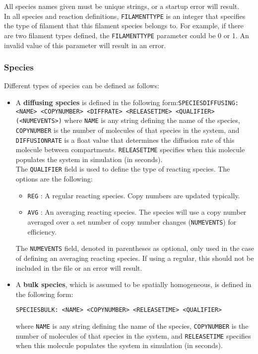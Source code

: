 \documentclass[11pt, oneside]{article}   	%
\begin{document}
\noindent All species names given must be unique strings, or a startup error will result.\\

\noindent In all species and reaction definitions, \texttt{FILAMENTTYPE} is an integer that specifies the type of filament that this filament species belongs to. For example, if there are two filament types defined, the \texttt{FILAMENTTYPE} parameter could be 0 or 1. An invalid value of this parameter will result in an error.

\subsubsection{Species}
Different types of species can be defined as follows:

\begin{itemize}
\item 
A \textbf{diffusing species} is defined in the following form:\newline\newline \texttt{SPECIESDIFFUSING: <NAME> <COPYNUMBER> <DIFFRATE> <RELEASETIME> <QUALIFIER> (<NUMEVENTS>)} \newline\newline where \texttt{NAME} is any string defining the name of the species, \texttt{COPYNUMBER} is the number of molecules of that species in the system, and \texttt{DIFFUSIONRATE} is a float value that determines the diffusion rate of this molecule between compartments. \texttt{RELEASETIME} specifies when this molecule populates the system in simulation (in seconds).\\

The \texttt{QUALIFIER} field is used to define the type of reacting species. The options are the following:
\begin{itemize}
\item \texttt{REG} : A regular reacting species. Copy numbers are updated typically.
\item \texttt{AVG} : An averaging reacting species. The species will use a copy number averaged over a set number of copy number changes (\texttt{NUMEVENTS}) for efficiency.
\end{itemize}
The \texttt{NUMEVENTS} field, denoted in parentheses as optional, only used in the case of defining an averaging reacting species. If using a regular, this should not be included in the file or an error will result.

\item
A \textbf{bulk species}, which is assumed to be spatially homogeneous, is defined in the following form:\newline\newline\centerline{\texttt{SPECIESBULK: <NAME> <COPYNUMBER> <RELEASETIME> <QUALIFIER>}}\newline\newline where \texttt{NAME} is any string defining the name of the species, \texttt{COPYNUMBER} is the number of molecules of that species in the system, and \texttt{RELEASETIME} specifies when this molecule populates the system in simulation (in seconds).


\end{itemize}
\end{document}
